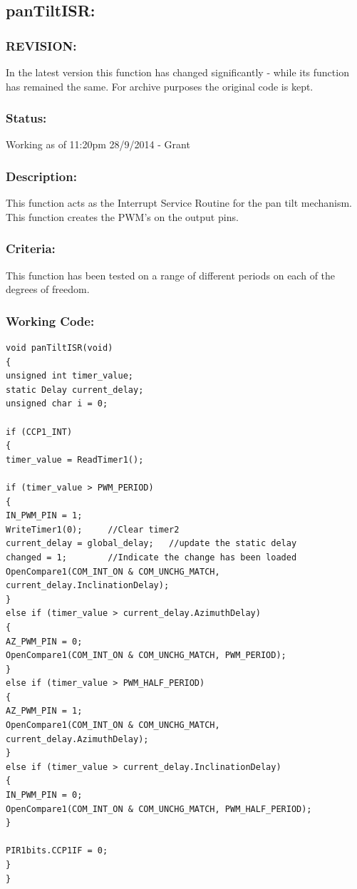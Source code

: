 \documentclass[]{report}
\begin{document}
\subsection{panTiltISR:}
\subsubsection{REVISION:}
In the latest version this function has changed significantly - while its function has remained the same. For archive purposes the original code is kept.

\subsubsection{Status:}
Working as of 11:20pm 28/9/2014 - Grant

\subsubsection{Description:}
This function acts as the Interrupt Service Routine for the pan tilt mechanism. This function creates the PWM's on the output pins.

\subsubsection{Criteria:}
This function has been tested on a range of different periods on each of the degrees of freedom.

\subsubsection{Working Code:}
\begin{lstlisting}
void panTiltISR(void)
{
unsigned int timer_value;
static Delay current_delay;
unsigned char i = 0;

if (CCP1_INT)
{
timer_value = ReadTimer1();

if (timer_value > PWM_PERIOD)
{
IN_PWM_PIN = 1;
WriteTimer1(0);     //Clear timer2
current_delay = global_delay;   //update the static delay
changed = 1;        //Indicate the change has been loaded
OpenCompare1(COM_INT_ON & COM_UNCHG_MATCH, current_delay.InclinationDelay);
}
else if (timer_value > current_delay.AzimuthDelay)
{
AZ_PWM_PIN = 0;
OpenCompare1(COM_INT_ON & COM_UNCHG_MATCH, PWM_PERIOD);
}
else if (timer_value > PWM_HALF_PERIOD)
{
AZ_PWM_PIN = 1;
OpenCompare1(COM_INT_ON & COM_UNCHG_MATCH, current_delay.AzimuthDelay);
}
else if (timer_value > current_delay.InclinationDelay)
{
IN_PWM_PIN = 0;
OpenCompare1(COM_INT_ON & COM_UNCHG_MATCH, PWM_HALF_PERIOD);
}

PIR1bits.CCP1IF = 0;
}
}
\end{lstlisting}
\end{document}
